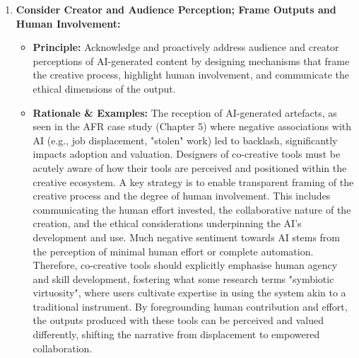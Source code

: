 \begin{enumerate}[label=\arabic*., wide, labelindent=0pt]
\item \textbf{Consider Creator and Audience Perception; Frame Outputs and Human Involvement:}
    \begin{itemize}[label=\textbullet, leftmargin=*]
        \item \textbf{Principle:} Acknowledge and proactively address audience and creator perceptions of AI-generated content by designing mechanisms that frame the creative process, highlight human involvement, and communicate the ethical dimensions of the output.
        \item \textbf{Rationale \& Examples:} The reception of AI-generated artefacts, as seen in the AFR case study (Chapter 5) where negative associations with AI (e.g., job displacement, "stolen" work) led to backlash, significantly impacts adoption and valuation. Designers of co-creative tools must be acutely aware of how their tools are perceived and positioned within the creative ecosystem. A key strategy is to enable transparent framing of the creative process and the degree of human involvement. This includes communicating the human effort invested, the collaborative nature of the creation, and the ethical considerations underpinning the AI's development and use. Much negative sentiment towards AI stems from the perception of minimal human effort or complete automation. Therefore, co-creative tools should explicitly emphasise human agency and skill development, fostering what some research terms "symbiotic virtuosity", where users cultivate expertise in using the system akin to a traditional instrument. By foregrounding human contribution and effort, the outputs produced with these tools can be perceived and valued differently, shifting the narrative from displacement to empowered collaboration.
    \end{itemize}


\end{enumerate}
